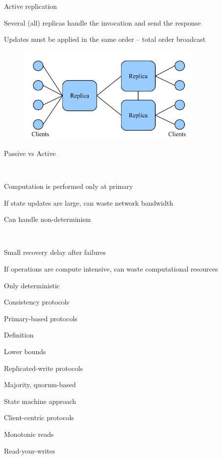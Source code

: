 \begin{frame}{Active replication}
\BI
\item Several (all) replicas handle the invocation and send the response
\item Updates must be applied in the same order – total order broadcast 
\EI
\begin{figure}
	\includegraphics[width=0.8\textwidth]{active}
\end{figure}

\end{frame}

\begin{frame}{Passive vs Active}

\\
\BI
\item Computation is performed only at primary
\item If state updates are large, can waste network bandwidth
\item Can handle non-determinism
\EI

\bigskip
{}\\
\BI
\item Small recovery delay after failures
\item If operations are compute intensive, can waste computational resources
\item Only deterministic
\EI

\end{frame}


\begin{frame}{Consistency protocols}

\BIL
\item Primary-based protocols
	\BI
	\item Definition
	\item Lower bounds
	\EI
\item Replicated-write protocols
	\BI
	\item Majority, quorum-based
	\item State machine approach
	\EI
\item Client-centric protocols
\BI
\item Monotonic reads
\item Read-your-writes
\EI
\EIL

\end{frame}

